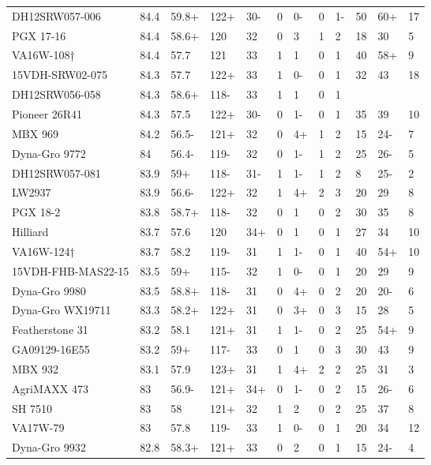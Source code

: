 \documentclass[12pt, letterpaper]{article}
\begin{document}
\begin{landscape}
\begin{ThreePartTable}
\begin{longtable}{llllllllllll}
  DH12SRW057-006 & 84.4 & 59.8+ & 122+ & 30- & 0 & 0- & 0 & 1- & 50 & 60+ & 17 \\ 
  PGX 17-16 & 84.4 & 58.6+ & 120 & 32 & 0 & 3 & 1 & 2 & 18 & 30 & 5 \\ 
  VA16W-108† & 84.4 & 57.7 & 121 & 33 & 1 & 1 & 0 & 1 & 40 & 58+ & 9 \\ 
  15VDH-SRW02-075 & 84.3 & 57.7 & 122+ & 33 & 1 & 0- & 0 & 1 & 32 & 43 & 18 \\ 
  DH12SRW056-058 & 84.3 & 58.6+ & 118- & 33 & 1 & 1 & 0 & 1 &  &  &  \\ 
  Pioneer 26R41 & 84.3 & 57.5 & 122+ & 30- & 0 & 1- & 0 & 1 & 35 & 39 & 10 \\ 
  MBX 969 & 84.2 & 56.5- & 121+ & 32 & 0 & 4+ & 1 & 2 & 15 & 24- & 7 \\ 
  Dyna-Gro 9772 & 84 & 56.4- & 119- & 32 & 0 & 1- & 1 & 2 & 25 & 26- & 5 \\ 
  DH12SRW057-081 & 83.9 & 59+ & 118- & 31- & 1 & 1- & 1 & 2 & 8 & 25- & 2 \\ 
  LW2937 & 83.9 & 56.6- & 122+ & 32 & 1 & 4+ & 2 & 3 & 20 & 29 & 8 \\ 
  PGX 18-2 & 83.8 & 58.7+ & 118- & 32 & 0 & 1 & 0 & 2 & 30 & 35 & 8 \\ 
  Hilliard & 83.7 & 57.6 & 120 & 34+ & 0 & 1 & 0 & 1 & 27 & 34 & 10 \\ 
  VA16W-124† & 83.7 & 58.2 & 119- & 31 & 1 & 1- & 0 & 1 & 40 & 54+ & 10 \\ 
  15VDH-FHB-MAS22-15 & 83.5 & 59+ & 115- & 32 & 1 & 0- & 0 & 1 & 20 & 29 & 9 \\ 
  Dyna-Gro 9980 & 83.5 & 58.8+ & 118- & 31 & 0 & 4+ & 0 & 2 & 20 & 20- & 6 \\ 
  Dyna-Gro WX19711 & 83.3 & 58.2+ & 122+ & 31 & 0 & 3+ & 0 & 3 & 15 & 28 & 5 \\ 
  Featherstone 31 & 83.2 & 58.1 & 121+ & 31 & 1 & 1- & 0 & 2 & 25 & 54+ & 9 \\ 
  GA09129-16E55 & 83.2 & 59+ & 117- & 33 & 0 & 1 & 0 & 3 & 30 & 43 & 9 \\ 
  MBX 932 & 83.1 & 57.9 & 123+ & 31 & 1 & 4+ & 2 & 2 & 25 & 31 & 3 \\ 
  AgriMAXX 473 & 83 & 56.9- & 121+ & 34+ & 0 & 1- & 0 & 2 & 15 & 26- & 6 \\ 
  SH 7510 & 83 & 58 & 121+ & 32 & 1 & 2 & 0 & 2 & 25 & 37 & 8 \\ 
  VA17W-79 & 83 & 57.8 & 119- & 33 & 1 & 0- & 0 & 1 & 20 & 34 & 12 \\ 
  Dyna-Gro 9932 & 82.8 & 58.3+ & 121+ & 33 & 0 & 2 & 0 & 1 & 15 & 24- & 4 \\ 

\end{longtable}
\end{ThreePartTable}
\end{landscape}
\end{document}
